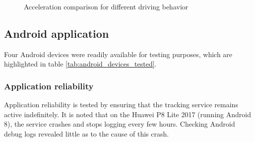 \begin{figure}[H]
\centering
\caption{Acceleration comparison for different driving behavior}
\label{fig:accel}
\end{figure}


\subsection{Android application}
Four Android devices were readily available for testing purposes, which are highlighted in table \ref{tab:android_devices_tested}.

\subsubsection{Application reliability}
Application reliability is tested by ensuring that the tracking service remains active indefinitely.
It is noted that on the Huawei P8 Lite 2017 (running Android 8), the service crashes and stops logging every few hours.
Checking Android debug logs revealed little as to the cause of this crash.

